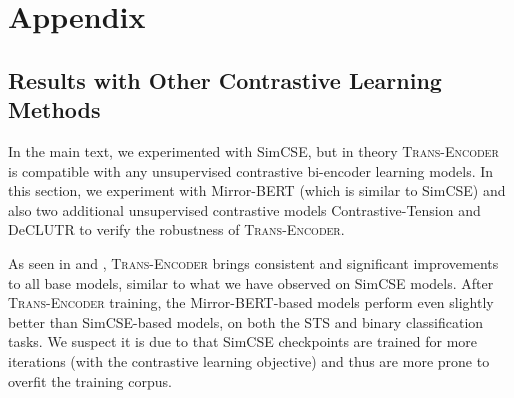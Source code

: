 \documentclass{article} \usepackage{iclr2021_conference,times}
\newcommand{\modelname}{\textsc{Trans-Encoder}\xspace}
\begin{document}



\appendix
\section{Appendix}


\subsection{Results with Other Contrastive Learning Methods}\label{app:mirrorbert}

In the main text, we experimented with SimCSE, but in theory \modelname is compatible with any unsupervised contrastive bi-encoder learning models. In this section, we experiment with Mirror-BERT (which is similar to SimCSE) and also two additional unsupervised contrastive models Contrastive-Tension \citep{carlsson2021semantic} and DeCLUTR \citep{giorgi-etal-2021-declutr} to verify the robustness of \modelname. 

As seen in  and , \modelname brings consistent and significant improvements to all base models, similar to what we have observed on SimCSE models. 
After \modelname training, the Mirror-BERT-based models perform even slightly better than SimCSE-based models, on both the STS and binary classification tasks. We suspect it is due to that SimCSE checkpoints are trained for more iterations (with the contrastive learning objective) and thus are more prone to overfit the training corpus.
\end{document}
